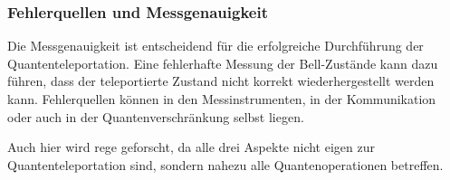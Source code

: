 \subsubsection{Fehlerquellen und Messgenauigkeit}
Die Messgenauigkeit ist entscheidend für die erfolgreiche Durchführung der Quantenteleportation.
Eine fehlerhafte Messung der Bell-Zustände kann dazu führen, dass der teleportierte Zustand nicht korrekt wiederhergestellt werden kann.
Fehlerquellen können in den Messinstrumenten, in der Kommunikation oder auch in der Quantenverschränkung selbst liegen.

Auch hier wird rege geforscht, da alle drei Aspekte nicht eigen zur Quantenteleportation sind, sondern nahezu alle
Quantenoperationen betreffen.



